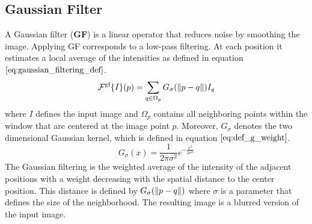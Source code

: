 \subsection{Gaussian Filter}
A Gaussian filter (\textbf{GF}) is a linear operator that reduces noise by smoothing the image. Applying GF corresponds to a low-pass filtering.
At each position it estimates a local average of the intensities as defined in equation $\ref{eq:gaussian_filtering_def}$.
\begin{equation}
	\mathcal{F}^{\text{gf}} \{I \} (p) = \sum_{q \in \Omega_p} G_{\sigma} (\left\lVert p - q\right\rVert) I_q
\label{eq:gaussian_filtering_def}
\end{equation}
where $I$ defines the input image and $\Omega_p$ contains all neighboring points within the window that are centered at the image point $p$. Moreover, $G_{\sigma}$ denotes the two dimensional Gaussian kernel, which is defined in equation $\ref{eq:def_g_weight}$.
\begin{equation}
	G_{\sigma} (x) = \frac{1}{2 \pi \sigma^2} e^{-\frac{x^2}{2 \sigma^2}}
\label{eq:def_g_weight}
\end{equation}
The Gaussian filtering is the weighted average of the intensity of the adjacent positions with a weight decreasing with the spatial distance to the center position. This distance is defined by $G_{\sigma} (\left\lVert p - q\right\rVert)$ where $\sigma$ is a parameter that defines the size of the neighborhood. The resulting image is a blurred version of the input image.

